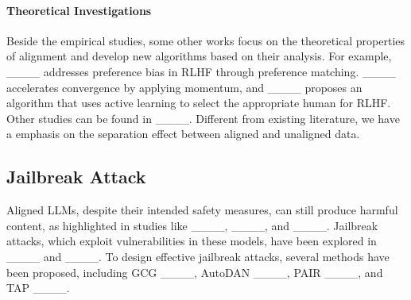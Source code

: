 \paragraph{Theoretical Investigations} Beside the empirical studies, some other works focus on the theoretical properties of alignment and develop new algorithms based on their analysis. For example, ____ addresses preference bias in RLHF through preference matching. ____ accelerates convergence by applying momentum, and ____ proposes an algorithm that uses active learning to select the appropriate human for RLHF. 
Other studies can be found in ____.
Different from existing literature, we have a emphasis on the separation effect between aligned and unaligned data. 


\subsection{Jailbreak Attack}
Aligned LLMs, despite their intended safety measures, can still produce harmful content, as highlighted in studies like ____, ____, and ____. Jailbreak attacks, which exploit vulnerabilities in these models, have been explored in ____ and ____. To design effective jailbreak attacks, several methods have been proposed, including GCG ____, AutoDAN ____, PAIR ____, and TAP ____. 


